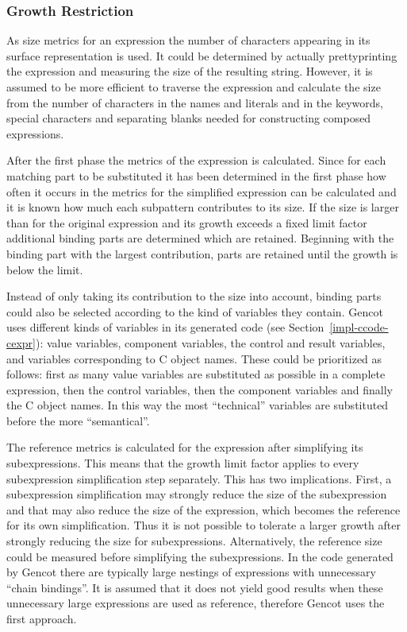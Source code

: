 \subsubsection{Growth Restriction}

As size metrics for an expression the number of characters appearing in its surface representation is used. It could be determined
by actually prettyprinting the expression and measuring the size of the resulting string. However, it is assumed to be more
efficient to traverse the expression and calculate the size from the number of characters in the names and literals and in
the keywords, special characters and separating blanks needed for constructing composed expressions.

After the first phase the metrics of the  expression is calculated. Since for each matching part to be substituted it 
has been determined in the first phase how often it occurs in  the metrics for the simplified expression can be 
calculated and it is known how much each subpattern contributes to its size. If the size is larger than for the original 
expression and its growth exceeds a fixed limit factor additional binding parts are determined which are retained. 
Beginning with the binding part with the largest contribution, parts are retained until the growth is below the limit.

Instead of only taking its contribution to the size into account, binding parts could also be selected according to the kind of
variables they contain. 
Gencot uses different kinds of variables in its generated code (see Section~\ref{impl-ccode-cexpr}): value variables, component
variables, the control and result variables, and variables corresponding to C object names. These could be prioritized
as follows: first as many value 
variables are substituted as possible in a complete expression, then the control variables, then the component variables and
finally the C object names. In this way the most ``technical'' variables are substituted before the more ``semantical''.

The reference metrics is calculated for the expression after simplifying its subexpressions. This means that the growth limit factor
applies to every subexpression simplification step separately. This has two implications. First, a subexpression simplification
may strongly reduce the size of the subexpression and that may also reduce the size of the  expression, which becomes 
the reference for its own simplification. Thus it is not possible to tolerate a larger growth after strongly reducing the size for
subexpressions. Alternatively, the reference size could be measured before simplifying the subexpressions. In the code generated
by Gencot there are typically large nestings of  expressions with unnecessary ``chain bindings''. It is assumed that it
does not yield good results when these unnecessary large expressions are used as reference, therefore Gencot uses the first approach.

